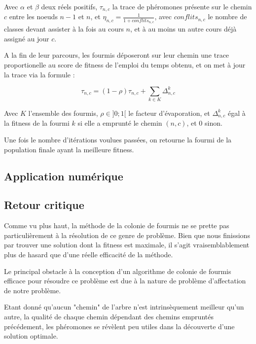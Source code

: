 Avec $\alpha$ et $\beta$ deux réels positifs, $\tau_{n,c}$ la trace de phéromones présente sur le chemin $c$ entre les noeuds $n-1$ et $n$, et $\eta_{n,c} = \frac{1}{1 + conflits_{n,c}}$, avec $conflits_{n,c}$ le nombre de classes devant assister à la fois au cours $n$, et à au moins un autre cours déjà assigné au jour $c$.

A la fin de leur parcours, les fourmis déposeront sur leur chemin une trace proportionelle au score de fitness de l'emploi du temps obtenu, et on met à jour la trace via la formule :

$$\tau_{n,c} = (1-\rho)\tau_{n,c} + \sum_{k \in K}{\Delta^k_{n,c}}$$

Avec $K$ l'ensemble des fourmis, $\rho \in ]0;1[$ le facteur d'évaporation, et $\Delta^k_{n,c}$ égal à la fitness de la fourmi $k$ si elle a emprunté le chemin $(n,c)$, et $0$ sinon.

Une fois le nombre d'itérations voulues passées, on retourne la fourmi de la population finale ayant la meilleure fitness.

\subsection{Application numérique}

\subsection{Retour critique}

Comme vu plus haut, la méthode de la colonie de fourmis ne se prette pas particulièrement à la résolution de ce genre de problème. Bien que nous finissions par trouver une solution dont la fitness est maximale, il s'agit vraisemblablement plus de hasard que d'une réelle efficacité de la méthode.

Le principal obstacle à la conception d'un algorithme de colonie de fourmis efficace pour résoudre ce problème est due à la nature de problème d'affectation de notre problème.

Etant donné qu'aucun "chemin" de l'arbre n'est intrinsèquement meilleur qu'un autre, la qualité de chaque chemin dépendant des chemins empruntés précédement, les phéromones se révèlent peu utiles dans la découverte d'une solution optimale.